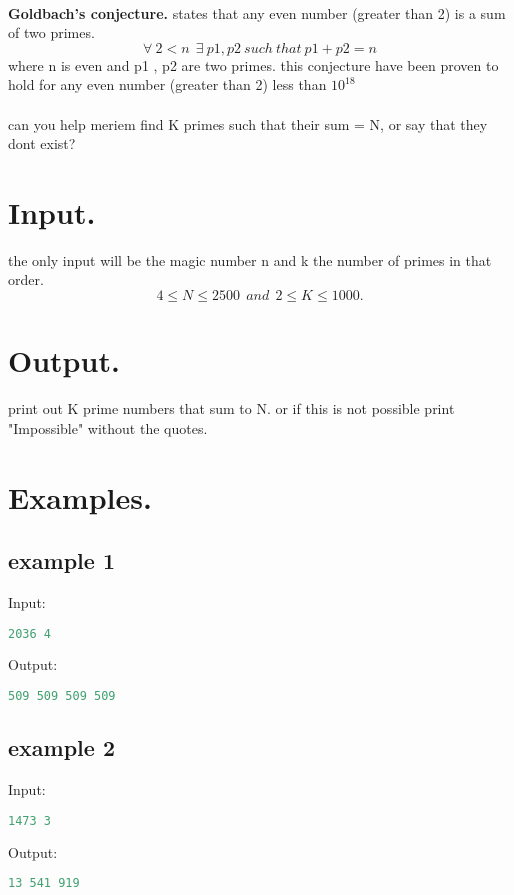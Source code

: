 \documentclass[10pt]{article}
\begin{document}
\paragraph{}
\textbf{Goldbach's conjecture.} states that any even number (greater than 2) is a sum of two primes.
$$ \forall\ 2<n\ \ \exists\  p1,p2\ such\ that\  p1+p2=n $$
where n is even and p1 , p2 are two primes. 
this conjecture have been proven to hold for any even number (greater than 2) less than $10^{18}$
\paragraph{}
can you help meriem find K primes such that their sum = N, or say that they dont exist?
\section{Input.}
the only input will be the magic number n and k the number of primes in that order.
$$4\le N \le 2500\ \  and\ \  2 \le K \le 1000.$$

\section{Output.}

print out K prime numbers that sum to N. or if this is not possible print "Impossible" without the quotes.

\section{Examples.}
\subsection{example 1}
Input:
\begin{lstlisting}[language=Python]
2036 4
\end{lstlisting}
Output:
\begin{lstlisting}[language=Python]
509 509 509 509 
\end{lstlisting}
\subsection{example 2}
Input:
\begin{lstlisting}[language=Python]
1473 3
\end{lstlisting}
Output:
\begin{lstlisting}[language=Python]
13 541 919
\end{lstlisting}
\end{document}
